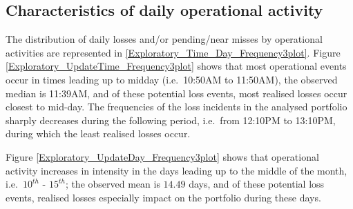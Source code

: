 \documentclass[]{article}
\begin{document}
\subsection{Characteristics of daily operational activity}

The distribution of daily losses and/or pending/near misses by
operational activities are represented in
\ref{Exploratory_Time_Day_Frequency3plot}. Figure
\ref{Exploratory_UpdateTime_Frequency3plot} shows that most operational
events occur in times leading up to midday (i.e.~10:50AM to 11:50AM),
the observed median is 11:39AM, and of these potential loss events, most
realised losses occur closest to mid-day. The frequencies of the loss
incidents in the analysed portfolio sharply decreases during the
following period, i.e.~from 12:10PM to 13:10PM, during which the least
realised losses occur.\medskip

Figure \ref{Exploratory_UpdateDay_Frequency3plot} shows that operational
activity increases in intensity in the days leading up to the middle of
the month, i.e.~\(10^{th}\) - \(15^{th}\); the observed mean is
\(14.49\) days, and of these potential loss events, realised losses
especially impact on the portfolio during these days.

\singlespacing

\doublespacing
\end{document}

